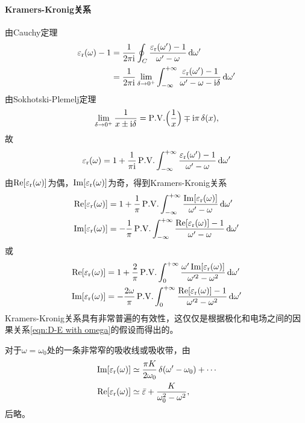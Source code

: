 \paragraph{Kramers-Kronig关系}
由Cauchy定理
\begin{align*}
    \varepsilon_\text r(\omega)-1&=\frac1{2\pi\mathrm{i}}\oint_C\frac{\varepsilon_\text r(\omega')-1}{\omega'-\omega}\mathop{}\!\mathrm{d}\omega'\\
    &=\frac1{2\pi\mathrm{i}}\lim_{\delta\to0^+}\int_{-\infty}^{+\infty}\frac{\varepsilon_\text r(\omega')-1}{\omega'-\omega-\mathrm{i}\delta}\mathop{}\!\mathrm{d}\omega'
\end{align*}
由Sokhotski-Plemelj定理
\[
    \lim_{\delta\to0^+}\frac1{x\pm\mathrm{i}\delta}=\mathop{}\!\mathrm{P.V.}\Bigl(\frac1x\Bigr)\mp\mathrm{i}\pi\mathop{}\!\delta(x),
\]
故
\[
    \varepsilon_\text r(\omega)=1+\frac1{\pi\mathrm{i}}\mathop{}\!\mathrm{P.V.}\int_{-\infty}^{+\infty}\frac{\varepsilon_\text r(\omega')-1}{\omega'-\omega}\mathop{}\!\mathrm{d}\omega'
\]
由$\operatorname{Re}[\varepsilon_\text r(\omega)]$为偶，$\operatorname{Im}[\varepsilon_\text r(\omega)]$为奇，得到Kramers-Kronig关系
\begin{equation}
    \begin{aligned}
        \operatorname{Re}[\varepsilon_\text r(\omega)]&=1+\frac1\pi\mathop{}\!\mathrm{P.V.}\int_{-\infty}^{+\infty}\frac{\operatorname{Im}[\varepsilon_\text r(\omega)]}{\omega'-\omega}\mathop{}\!\mathrm{d}\omega'\\
        \operatorname{Im}[\varepsilon_\text r(\omega)]&=-\frac1\pi\mathop{}\!\mathrm{P.V.}\int_{-\infty}^{+\infty}\frac{\operatorname{Re}[\varepsilon_\text r(\omega)]-1}{\omega'-\omega}\mathop{}\!\mathrm{d}\omega'\\
    \end{aligned}
\end{equation}
或
\begin{equation}
    \begin{aligned}
        \operatorname{Re}[\varepsilon_\text r(\omega)]&=1+\frac2\pi\mathop{}\!\mathrm{P.V.}\int_0^{+\infty}\frac{\omega'\operatorname{Im}[\varepsilon_\text r(\omega)]}{\omega'^2-\omega^2}\mathop{}\!\mathrm{d}\omega'\\
        \operatorname{Im}[\varepsilon_\text r(\omega)]&=-\frac{2\omega}\pi\mathop{}\!\mathrm{P.V.}\int_0^{+\infty}\frac{\operatorname{Re}[\varepsilon_\text r(\omega)]-1}{\omega'^2-\omega^2}\mathop{}\!\mathrm{d}\omega'\\
    \end{aligned}
\end{equation}
Kramers-Kronig关系具有非常普遍的有效性，这仅仅是根据极化和电场之间的因果关系\eqref{eqn:D-E with omega}的假设而得出的。

对于$\omega=\omega_0$处的一条非常窄的吸收线或吸收带，由
\begin{align*}
    \operatorname{Im}[\varepsilon_\text r(\omega)]&\simeq\frac{\pi K}{2\omega_0}\mathop{}\!\delta(\omega'-\omega_0)+\cdots\\
    \operatorname{Re}[\varepsilon_\text r(\omega)]&\simeq\bar\varepsilon+\frac K{\omega_0^2-\omega^2},
\end{align*}
后略。

